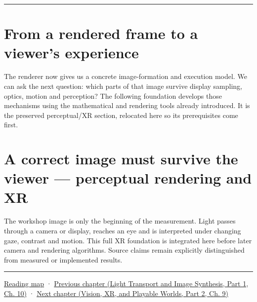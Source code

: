 \begin{center}\rule{0.5\linewidth}{0.5pt}\end{center}

\section{From a rendered frame to a viewer's experience}\label{04-visual-computing-ii-ch041-from-a-rendered-frame-to-a-viewers-experience}

\hypertarget{04-visual-computing-ii-ch041-from-a-rendered-frame-to-a-viewers-experience}{}

The renderer now gives us a concrete image-formation and execution model. We can ask the next question: which parts of that image survive display sampling, optics, motion and perception? The following foundation develops those mechanisms using the mathematical and rendering tools already introduced. It is the preserved perceptual/XR section, relocated here so its prerequisites come first.

\section{A correct image must survive the viewer --- perceptual rendering and XR}\label{04-visual-computing-ii-ch041-a-correct-image-must-survive-the-viewer-perceptual-rendering-and-xr}

\hypertarget{04-visual-computing-ii-ch041-a-correct-image-must-survive-the-viewer-perceptual-rendering-and-xr}{}

The workshop image is only the beginning of the measurement. Light passes through a camera or display, reaches an eye and is interpreted under changing gaze, contrast and motion. This full XR foundation is integrated here before later camera and rendering algorithms. Source claims remain explicitly distinguished from measured or implemented results.

\begin{center}\rule{0.5\linewidth}{0.5pt}\end{center}

\hyperref[volume-reading-map]{Reading map} · \href{../04-Light-Transport-and-Image-Synthesis-P01/main.pdf\#nameddest=04-visual-computing-ii-ch040-lighting-reconstruction-and-surface-motion}{Previous chapter (Light Transport and Image Synthesis, Part 1, Ch. 10)} · \href{../07-Vision-XR-and-Playable-Worlds-P02/main.pdf\#nameddest=04-visual-computing-ii-ch042-xr-radiometry-optics-and-perception}{Next chapter (Vision, XR, and Playable Worlds, Part 2, Ch. 9)}
